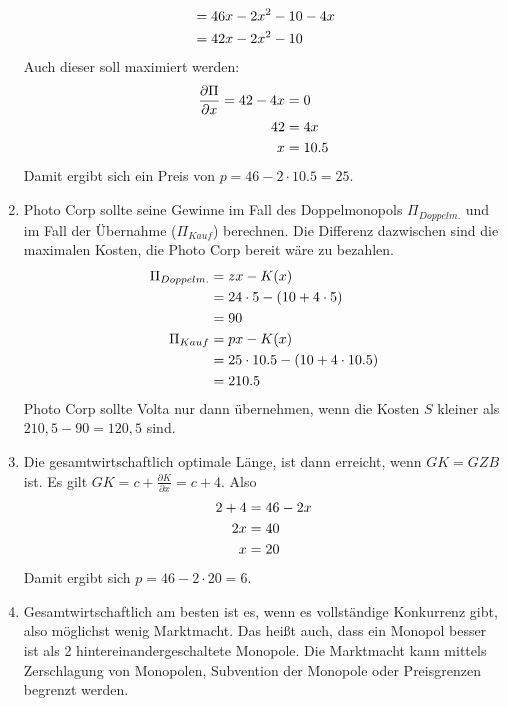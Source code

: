 \documentclass{article}
\begin{document}
\begin{enumerate}[label=(\alph*)]
\begin{align}
			&= 46x-2x^2-10-4x \notag \\
			&= 42x-2x^2-10 \notag
		\end{align}
		Auch dieser soll maximiert werden:
		\begin{align}
			\frac{\partial\Pi}{\partial x} = 42-4x&=0 \notag \\
			42 &= 4x \notag \\
			x &= 10.5 \notag
		\end{align}
		Damit ergibt sich ein Preis von $p=46-2\cdot 10.5= 25$.
		\item Photo Corp sollte seine Gewinne im Fall des Doppelmonopols $\Pi_{Doppelm.}$ und im Fall der Übernahme ($\Pi_{Kauf}$) berechnen. Die Differenz dazwischen sind die maximalen Kosten, die Photo Corp bereit wäre zu bezahlen.
		\begin{align}
			\Pi_{Doppelm.} &= zx - K(x) \notag \\
			&= 24\cdot 5 - (10+4\cdot 5) \notag \\
			&= 90 \notag \\
			\Pi_{Kauf} &= px - K(x) \notag \\
			&= 25\cdot 10.5 - (10+4\cdot 10.5) \notag \\
			&= 210.5 \notag
		\end{align}
		Photo Corp sollte Volta nur dann übernehmen, wenn die Kosten $S$ kleiner als $210,5-90=120,5$ sind.
		\item Die gesamtwirtschaftlich optimale Länge, ist dann erreicht, wenn $GK=GZB$ ist. Es gilt $GK = c + \frac{\partial K}{\partial x} = c + 4$. Also
		\begin{align}
			2+4 &= 46-2x \notag \\
			2x &= 40 \notag \\
			x &= 20 \notag
		\end{align}
		Damit ergibt sich $p=46-2\cdot 20=6$.
		\item Gesamtwirtschaftlich am besten ist es, wenn es vollständige Konkurrenz gibt, also möglichst wenig Marktmacht. Das heißt auch, dass ein Monopol besser ist als 2 hintereinandergeschaltete Monopole. Die Marktmacht kann mittels Zerschlagung von Monopolen, Subvention der Monopole oder Preisgrenzen begrenzt werden.
	\end{enumerate}
\end{document}
